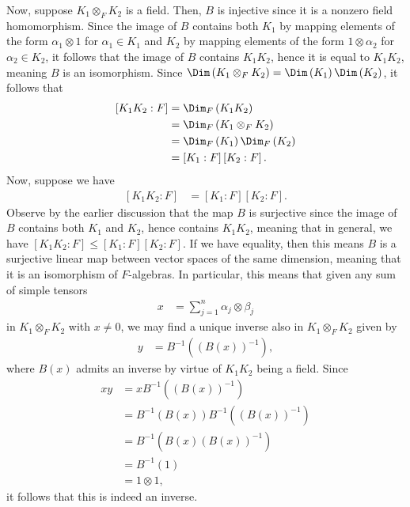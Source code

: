 \documentclass[10pt]{mypackage}
\begin{document}
\begin{solution}
  Now, suppose $K_1\otimes_{F}K_2$ is a field. Then, $B$ is injective since it is a nonzero field homomorphism. Since the image of $B$ contains both $K_1$ by mapping elements of the form $\alpha_1\otimes 1$ for $\alpha_1\in K_1$ and $K_2$ by mapping elements of the form $1\otimes \alpha_2$ for $\alpha_2\in K_2$, it follows that the image of $B$ contains $K_1K_2$, hence it is equal to $K_1K_2$, meaning $B$ is an isomorphism. Since $\Dim\left( K_1\otimes_{F}K_2 \right) = \Dim\left( K_1 \right)\Dim\left( K_2 \right)$, it follows that
  \begin{align*}
    \left[ K_1K_2:F \right] &= \Dim_{F}\left( K_1K_2 \right)\\
                            &= \Dim_{F} \left( K_1\otimes_{F}K_2 \right)\\
                            &= \Dim_{F}\left( K_1 \right)\Dim_{F}\left( K_2 \right)\\
                            &= \left[ K_1:F \right]\left[ K_2:F \right].
  \end{align*}
  Now, suppose we have
  \begin{align*}
    \left[ K_1K_2:F \right] &= \left[ K_1:F \right]\left[ K_2:F \right].
  \end{align*}
  Observe by the earlier discussion that the map $B$ is surjective since the image of $B$ contains both $K_1$ and $K_2$, hence contains $K_1K_2$, meaning that in general, we have $\left[ K_1K_2:F \right]\leq \left[ K_1:F \right]\left[ K_2:F \right]$. If we have equality, then this means $B$ is a surjective linear map between vector spaces of the same dimension, meaning that it is an isomorphism of $F$-algebras. In particular, this means that given any sum of simple tensors
  \begin{align*}
    x &=\sum_{j=1}^{n}\alpha_j\otimes \beta_j
  \end{align*}
  in $K_1\otimes_{F}K_2$ with $x\neq 0$, we may find a unique inverse also in $K_1\otimes_{F}K_2$ given by
  \begin{align*}
    y &= B^{-1} \left( \left( B(x) \right)^{-1} \right),
  \end{align*}
  where $B(x)$ admits an inverse by virtue of $K_1K_2$ being a field. Since
  \begin{align*}
    xy &= x B^{-1}\left( \left( B\left( x \right) \right)^{-1} \right)\\
       &= B^{-1}\left( B(x) \right)B^{-1}\left( \left( B\left( x \right) \right)^{-1} \right)\\
       &= B^{-1} \left( B\left( x \right)\left( B\left( x \right) \right)^{-1} \right)\\
       &= B^{-1}\left( 1 \right)\\
       &= 1\otimes 1,
  \end{align*}
  it follows that this is indeed an inverse.
\end{solution}
\end{document}
